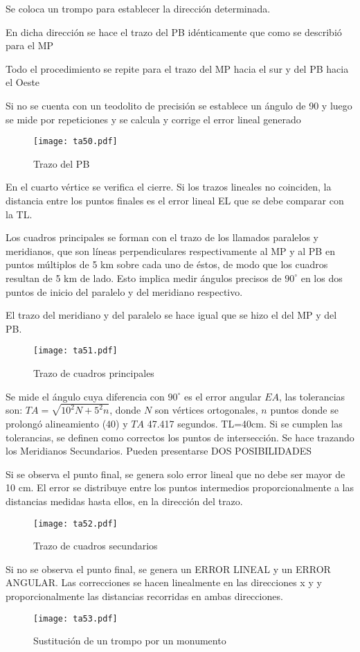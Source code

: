 Se coloca un trompo para establecer la dirección determinada.

En dicha dirección se hace el trazo del PB idénticamente que como se describió para el MP

Todo el procedimiento se repite para el trazo del MP hacia el sur y del PB hacia el Oeste

Si no se cuenta con un teodolito de precisión se establece un ángulo de 90 y luego se mide por repeticiones y se calcula y corrige el error lineal generado

\begin{figure}[h!]
\centering
  \texttt{[image: ta50.pdf]}
  \caption{Trazo del PB}
  \label{ta50}
\end{figure}
En el cuarto vértice se verifica el cierre. Si los trazos lineales no coinciden, la distancia entre los puntos finales es el error lineal EL que se debe comparar con la TL.

Los cuadros principales se forman con el trazo de los llamados paralelos y meridianos, que son líneas perpendiculares respectivamente al MP y al PB en puntos múltiplos de 5 km sobre cada uno de éstos, de modo que los cuadros resultan de 5 km de lado. Esto implica medir ángulos precisos de $90^{\circ}$ en los dos puntos de inicio del paralelo y del meridiano respectivo.

El trazo del meridiano y del paralelo se hace igual que se hizo el del MP y del PB.
\begin{figure}[h!]
\centering
  \texttt{[image: ta51.pdf]}
  \caption{Trazo de cuadros principales}
  \label{ta51}
\end{figure}
Se mide el ángulo cuya diferencia con $90^{\circ}$ es el error angular $EA$, las tolerancias son: $TA= \sqrt{10^2N+5^2n}$, donde $N$ son vértices ortogonales, $n$ puntos donde se prolongó alineamiento (40) y $TA$ 47.417 segundos. TL=40cm. Si se cumplen las tolerancias, se definen como correctos los puntos de intersección.
Se hace trazando los Meridianos Secundarios. Pueden presentarse DOS POSIBILIDADES

Si se observa el punto final, se genera solo error lineal que no debe ser mayor de 10 cm. El error se distribuye entre los puntos intermedios proporcionalmente a las distancias medidas hasta ellos, en la dirección del trazo.
\begin{figure}[h!]
\centering
  \texttt{[image: ta52.pdf]}
  \caption{Trazo de cuadros secundarios}
  \label{ta52}
\end{figure}
Si no se observa el punto final, se genera un ERROR LINEAL y un ERROR ANGULAR. Las correcciones se hacen linealmente en las direcciones x y y proporcionalmente las distancias recorridas en ambas direcciones.
\begin{figure}[h!]
\centering
  \texttt{[image: ta53.pdf]}
  \caption{Sustitución de un trompo por un monumento}
  \label{ta53}
\end{figure}

